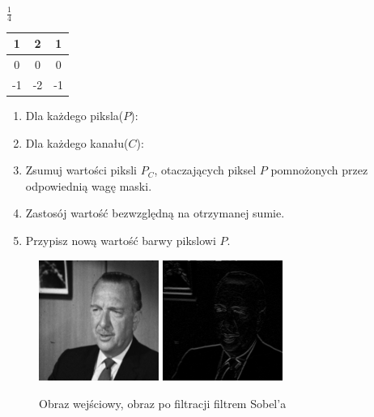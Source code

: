 \documentclass[final,a4paper,openany,12pt]{mwbk}
\begin{document}
\begin{center}
	$\frac{1}{4}$
	\begin{tabular}{|c|c|c|}
		\hline
		1 & 2 & 1\\
		\hline
		0 & 0 & 0\\
		\hline
		-1 & -2 & -1\\
		\hline
	\end{tabular}
\end{center}

\begin{enumerate}
	\item Dla każdego piksla($P$):
	\item Dla każdego kanału($C$):
	\item Zsumuj wartości piksli $P_C$, otaczających piksel $P$ pomnożonych przez odpowiednią wagę maski.
	\item Zastosój wartość bezwzględną na otrzymanej sumie.
	\item Przypisz nową wartość barwy pikslowi $P$.
\end{enumerate}

\begin{figure}[H]
	\begin{center}
		\includegraphics[width=0.35\textwidth]{gentelman_gray}
		\includegraphics[width=0.35\textwidth]{gentelman_gray_highpassSobol_result}
	\end{center}
	\caption{Obraz wejściowy, obraz po filtracji filtrem Sobel'a}
\end{figure}
\end{document}
